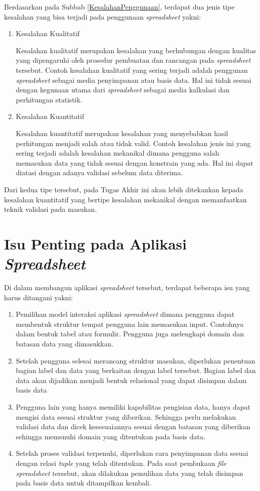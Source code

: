 Berdasarkan pada Subbab \ref{KesalahanPenggunaan}, terdapat dua jenis tipe kesalahan \citep{Panko1998} yang bisa terjadi pada penggunaan \textit{spreadsheet} yakni:
\begin{enumerate}
	\item Kesalahan Kualitatif

	Kesalahan kualitatif merupakan kesalahan yang berhubungan dengan kualitas yang dipengaruhi oleh prosedur pembuatan dan rancangan pada \textit{spreadsheet} tersebut. Contoh kesalahan kualitatif yang sering terjadi adalah penggunan \textit{spreadsheet} sebagai media penyimpanan atau basis data. Hal ini tidak sesuai dengan kegunaan utama dari \textit{spreadsheet} sebagai media kalkulasi dan perhitungan statistik.

	\item Kesalahan Kuantitatif

	Kesalahan kuantitatif merupakan kesalahan yang menyebabkan hasil perhitungan menjadi salah atau tidak valid. Contoh kesalahan jenis ini yang sering terjadi adalah kesalahan mekanikal dimana pengguna salah memasukan data yang tidak sesuai dengan konstrain yang ada. Hal ini dapat diatasi dengan adanya validasi sebelum data diterima. 
\end{enumerate}

Dari kedua tipe tersebut, pada Tugas Akhir ini akan lebih ditekankan kepada kesalahan kuantitatif yang bertipe kesalahan mekanikal dengan memanfaatkan teknik validasi pada masukan.

\section{Isu Penting pada Aplikasi \textit{Spreadsheet}}
Di dalam membangun aplikasi \textit{spreadsheet} tersebut, terdapat beberapa isu yang harus ditangani yakni:
\begin{enumerate}
	\item Pemilihan model interaksi aplikasi \textit{spreadsheet} dimana pengguna dapat membentuk struktur tempat pengguna lain memasukan input. Contohnya dalam bentuk tabel atau formulir. Pengguna juga melengkapi domain dan batasan data yang dimasukkan.
	\item Setelah pengguna selesai merancang struktur masukan, diperlukan penentuan bagian label dan data yang berkaitan dengan label tersebut. Bagian label dan data akan dijadikan menjadi bentuk relasional yang dapat disimpan dalam basis data
	\item Pengguna lain yang hanya memiliki kapabilitas pengisian data, hanya dapat mengisi data sesuai struktur yang diberikan. Sehingga perlu melakukan validasi data dan dicek kesesuaiannya sesuai dengan batasan yang diberikan sehingga memenuhi domain yang ditentukan pada basis data.
	\item Setelah proses validasi terpenuhi, diperlukan cara penyimpanan data sesuai dengan relasi \textit{tuple} yang telah ditentukan. Pada saat pembukaan \textit{file spreadsheet} tersebut, akan dilakukan pemulihan data yang telah disimpan pada basis data untuk ditampilkan kembali.
\end{enumerate}

